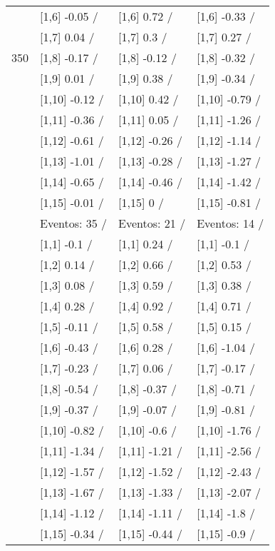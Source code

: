 \begin{table}
\begin{tabular}[t]{llll}
 & {}[1,6] -0.05  / & {}[1,6] 0.72  / & {}[1,6] -0.33  /\\
 & {}[1,7] 0.04  / & {}[1,7] 0.3  / & {}[1,7] 0.27  /\\
350 & {}[1,8] -0.17  / & {}[1,8] -0.12  / & {}[1,8] -0.32  /\\
\addlinespace
 & {}[1,9] 0.01  / & {}[1,9] 0.38  / & {}[1,9] -0.34  /\\
 & {}[1,10] -0.12  / & {}[1,10] 0.42  / & {}[1,10] -0.79  /\\
 & {}[1,11] -0.36  / & {}[1,11] 0.05  / & {}[1,11] -1.26  /\\
 & {}[1,12] -0.61  / & {}[1,12] -0.26  / & {}[1,12] -1.14  /\\
 & {}[1,13] -1.01  / & {}[1,13] -0.28  / & {}[1,13] -1.27  /\\
\addlinespace
 & {}[1,14] -0.65  / & {}[1,14] -0.46  / & {}[1,14] -1.42  /\\
 & {}[1,15] -0.01  / & {}[1,15] 0  / & {}[1,15] -0.81  /\\
 & Eventos:  35 / & Eventos:  21 / & Eventos:  14 /\\
 & {}[1,1] -0.1  / & {}[1,1] 0.24  / & {}[1,1] -0.1  /\\
 & {}[1,2] 0.14  / & {}[1,2] 0.66  / & {}[1,2] 0.53  /\\
\addlinespace
 & {}[1,3] 0.08  / & {}[1,3] 0.59  / & {}[1,3] 0.38  /\\
 & {}[1,4] 0.28  / & {}[1,4] 0.92  / & {}[1,4] 0.71  /\\
 & {}[1,5] -0.11  / & {}[1,5] 0.58  / & {}[1,5] 0.15  /\\
 & {}[1,6] -0.43  / & {}[1,6] 0.28  / & {}[1,6] -1.04  /\\
 & {}[1,7] -0.23  / & {}[1,7] 0.06  / & {}[1,7] -0.17  /\\
\addlinespace
500 & {}[1,8] -0.54  / & {}[1,8] -0.37  / & {}[1,8] -0.71  /\\
 & {}[1,9] -0.37  / & {}[1,9] -0.07  / & {}[1,9] -0.81  /\\
 & {}[1,10] -0.82  / & {}[1,10] -0.6  / & {}[1,10] -1.76  /\\
 & {}[1,11] -1.34  / & {}[1,11] -1.21  / & {}[1,11] -2.56  /\\
 & {}[1,12] -1.57  / & {}[1,12] -1.52  / & {}[1,12] -2.43  /\\
\addlinespace
 & {}[1,13] -1.67  / & {}[1,13] -1.33  / & {}[1,13] -2.07  /\\
 & {}[1,14] -1.12  / & {}[1,14] -1.11  / & {}[1,14] -1.8  /\\
 & {}[1,15] -0.34  / & {}[1,15] -0.44  / & {}[1,15] -0.9  /\\
\bottomrule
\end{tabular}
\end{table}
